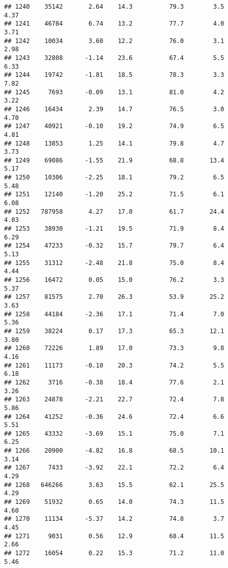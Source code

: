 \documentclass[
]{article}
\begin{document}
\begin{verbatim}
## 1240    35142       2.64    14.3          79.3        3.5              4.37
## 1241    46784       6.74    13.2          77.7        4.0              3.71
## 1242    10034       3.60    12.2          76.0        3.1              2.98
## 1243    32808      -1.14    23.6          67.4        5.5              6.33
## 1244    19742      -1.81    18.5          78.3        3.3              7.82
## 1245     7693      -0.09    13.1          81.0        4.2              3.22
## 1246    16434       2.39    14.7          76.5        3.0              4.70
## 1247    40921      -0.10    19.2          74.9        6.5              4.81
## 1248    13853       1.25    14.1          79.8        4.7              3.73
## 1249    69086      -1.55    21.9          68.8       13.4              5.17
## 1250    10306      -2.25    18.1          79.2        6.5              5.48
## 1251    12140      -1.20    25.2          71.5        6.1              6.08
## 1252   787958       4.27    17.0          61.7       24.4              4.03
## 1253    38930      -1.21    19.5          71.9        8.4              6.29
## 1254    47233      -0.32    15.7          79.7        6.4              5.13
## 1255    31312      -2.48    21.8          75.0        8.4              4.44
## 1256    16472       0.05    15.0          76.2        3.3              5.37
## 1257    81575       2.70    26.3          53.9       25.2              3.63
## 1258    44184      -2.36    17.1          71.4        7.0              5.36
## 1259    38224       0.17    17.3          65.3       12.1              3.80
## 1260    72226       1.89    17.0          73.3        9.8              4.16
## 1261    11173      -0.10    20.3          74.2        5.5              6.18
## 1262     3716      -0.38    18.4          77.6        2.1              3.26
## 1263    24878      -2.21    22.7          72.4        7.8              5.86
## 1264    41252      -0.36    24.6          72.4        6.6              5.51
## 1265    43332      -3.69    15.1          75.0        7.1              6.25
## 1266    20900      -4.82    16.8          68.5       10.1              3.14
## 1267     7433      -3.92    22.1          72.2        6.4              4.29
## 1268   646266       3.63    15.5          62.1       25.5              4.29
## 1269    51932       0.65    14.0          74.3       11.5              4.60
## 1270    11134      -5.37    14.2          74.8        3.7              4.45
## 1271     9031       0.56    12.9          68.4       11.5              2.66
## 1272    16054       0.22    15.3          71.2       11.0              5.46

\end{verbatim}
\end{document}
